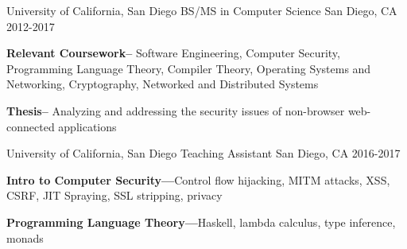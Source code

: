 


\begin{cventries}


\cventry
{University of California, San Diego} %
{BS/MS in Computer Science} %
{San Diego, CA} %
{2012-2017} %
{ %
\begin{cvitems}
\item {
  \textbf{Relevant Coursework--} Software Engineering, Computer Security,
  Programming Language Theory, Compiler Theory, Operating Systems and
  Networking, Cryptography, Networked and Distributed Systems
}
\item {
  \textbf{Thesis--} Analyzing and addressing the security issues of non-browser
  web-connected applications
}
\end{cvitems}
}


\cventry
{University of California, San Diego} %
{Teaching Assistant} %
{San Diego, CA} %
{2016-2017} %
{ %
\begin{cvitems}
\item {\textbf{Intro to Computer Security---}Control flow hijacking, MITM attacks, XSS, CSRF, JIT Spraying, SSL stripping, privacy}
\item {\textbf{Programming Language Theory---}Haskell, lambda calculus, type inference, monads}
\end{cvitems}
}


\end{cventries}
